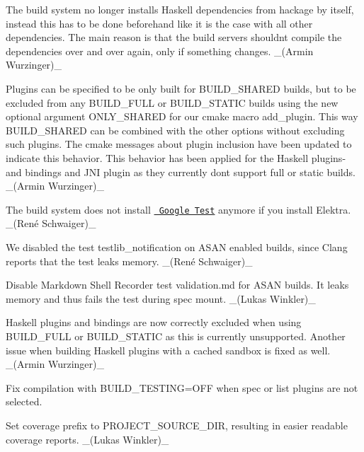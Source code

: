 \begin{DoxyItemize}
\item The build system no longer installs Haskell dependencies from hackage by itself, instead this has to be done beforehand like it is the case with all other dependencies. The main reason is that the build servers shouldn\textquotesingle{}t compile the dependencies over and over again, only if something changes. \+\_\+(\+Armin Wurzinger)\+\_\+
\item Plugins can be specified to be only built for {\ttfamily B\+U\+I\+L\+D\+\_\+\+S\+H\+A\+R\+ED} builds, but to be excluded from any {\ttfamily B\+U\+I\+L\+D\+\_\+\+F\+U\+LL} or {\ttfamily B\+U\+I\+L\+D\+\_\+\+S\+T\+A\+T\+IC} builds using the new optional argument {\ttfamily O\+N\+L\+Y\+\_\+\+S\+H\+A\+R\+ED} for our cmake macro {\ttfamily add\+\_\+plugin}. This way {\ttfamily B\+U\+I\+L\+D\+\_\+\+S\+H\+A\+R\+ED} can be combined with the other options without excluding such plugins. The cmake messages about plugin inclusion have been updated to indicate this behavior. This behavior has been applied for the Haskell plugins-\/ and bindings and J\+NI plugin as they currently don\textquotesingle{}t support full or static builds. \+\_\+(\+Armin Wurzinger)\+\_\+
\item The build system does not install \href{https://github.com/google/googletest}{\texttt{ Google Test}} anymore if you install Elektra. \+\_\+(René Schwaiger)\+\_\+
\item We disabled the test {\ttfamily testlib\+\_\+notification} on A\+S\+AN enabled builds, since Clang reports that the test leaks memory. \+\_\+(René Schwaiger)\+\_\+
\item Disable Markdown Shell Recorder test {\ttfamily validation.\+md} for A\+S\+AN builds. It leaks memory and thus fails the test during spec mount. \+\_\+(\+Lukas Winkler)\+\_\+
\item Haskell plugins and bindings are now correctly excluded when using {\ttfamily B\+U\+I\+L\+D\+\_\+\+F\+U\+LL} or {\ttfamily B\+U\+I\+L\+D\+\_\+\+S\+T\+A\+T\+IC} as this is currently unsupported. Another issue when building Haskell plugins with a cached sandbox is fixed as well. \+\_\+(\+Armin Wurzinger)\+\_\+
\item Fix compilation with {\ttfamily B\+U\+I\+L\+D\+\_\+\+T\+E\+S\+T\+I\+NG=O\+FF} when {\ttfamily spec} or {\ttfamily list} plugins are not selected.
\item Set coverage prefix to {\ttfamily P\+R\+O\+J\+E\+C\+T\+\_\+\+S\+O\+U\+R\+C\+E\+\_\+\+D\+IR}, resulting in easier readable coverage reports. \+\_\+(\+Lukas Winkler)\+\_\+

\end{DoxyItemize}
